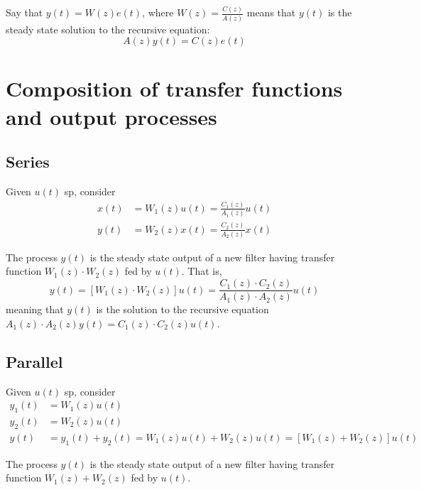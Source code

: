 
Say that $y(t)=W(z)e(t)$, where $W(z)=\frac{C(z)}{A(z)}$ means that $y(t)$ is the steady state solution to the recursive equation:
\[
	A(z)y(t)=C(z)e(t)
\]

\section{Composition of transfer functions and output processes}
\subsection{Series}
Given $u(t)$ \gls{sp}, consider
\begin{align*}
	x(t)&=W_{1}(z)u(t)=\frac{C_{1}(z)}{A_{1}(z)}u(t)\\
	y(t)&=W_{2}(z)x(t)=\frac{C_{2}(z)}{A_{2}(z)}x(t)
\end{align*}
\begin{figure}[htpb]
	\centering
\end{figure}
\FloatBarrier

\begin{theorem}
	The process $y(t)$ is the steady state output of a new filter having transfer function $W_{1}(z)\cdot W_{2}(z)$ fed by $u(t)$. That is,
	\[
		y(t)=[W_{1}(z)\cdot W_{2}(z)]u(t)=\frac{C_{1}(z)\cdot C_{2}(z)}{A_{1}(z)\cdot A_{2}(z)}u(t)
	\]
	meaning that $y(t)$ is the solution to the recursive equation $A_{1}(z)\cdot A_{2}(z) y(t) = C_{1}(z)\cdot C_{2}(z)u(t)$.
\end{theorem}

\subsection{Parallel}
Given $u(t)$ \gls{sp}, consider
\begin{align*}
	y_{1}(t)&=W_{1}(z)u(t)\\
	y_{2}(t)&=W_{2}(z)u(t)\\
	y(t)&=y_{1}(t)+y_{2}(t)=W_{1}(z)u(t)+W_{2}(z)u(t)=[W_{1}(z)+W_{2}(z)]u(t)
\end{align*}
\begin{theorem}
	The process $y(t)$ is the steady state output of a new filter having transfer function $W_{1}(z)+W_{2}(z)$ fed by $u(t)$.
\end{theorem}


